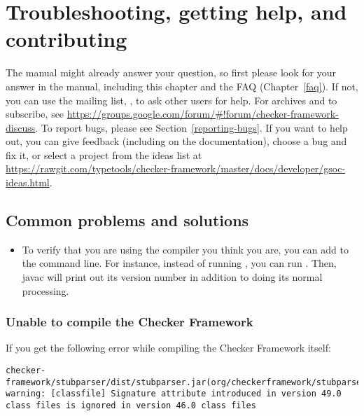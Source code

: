 \htmlhr
\chapter{Troubleshooting, getting help, and contributing\label{troubleshooting}}

\begin{sloppypar}
The manual might already answer your question, so first please look for
your answer in the manual,
including this chapter and the FAQ (Chapter~\ref{faq}).
If not, you can use the mailing list,
, to ask other users for
help.  For archives and to subscribe, see \url{https://groups.google.com/forum/#!forum/checker-framework-discuss}.
To report bugs, please see Section~\ref{reporting-bugs}.
If you want to help out, you can give feedback (including on the
documentation), choose a bug and fix it, or select a
project from the ideas list at
\url{https://rawgit.com/typetools/checker-framework/master/docs/developer/gsoc-ideas.html}.
\end{sloppypar}


\section{Common problems and solutions\label{common-problems}}

\begin{itemize}
\item
To verify that you are using the compiler you think you are, you can add
 to the command line.  For instance, instead of running
, you can run .  Then, javac will print out its version number in addition
to doing its normal processing.

\end{itemize}


\subsection{Unable to compile the Checker Framework\label{common-problems-compiling}}

If you get the following error while compiling the Checker Framework itself:

\begin{smaller}
\begin{Verbatim}
checker-framework/stubparser/dist/stubparser.jar(org/checkerframework/stubparser/ast/CompilationUnit.class):
warning: [classfile] Signature attribute introduced in version 49.0 class files is ignored in version 46.0 class files
\end{Verbatim}
\end{smaller}

